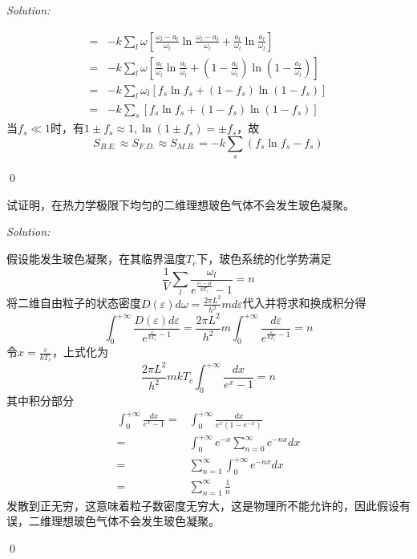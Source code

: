 \documentclass[12pt,a4paper]{article}
\newenvironment{problem}[2][Problem]{\begin{trivlist}
\item[\hskip \labelsep {\bfseries #1}\hskip \labelsep {\bfseries #2.}]}{\end{trivlist}}
\newenvironment{sol}
    {\emph{Solution:}
    }
    {
    \qed
    }
\begin{document}
\begin{sol}
\begin{align}
\nonumber=&-k\sum_l\omega[\frac{\omega_l-a_l}{\omega_l}\ln\frac{\omega_l-a_l}{\omega_l}+\frac{a_l}{\omega_l}\ln\frac{a_l}{\omega_l}]\\
\nonumber=&-k\sum_l\omega[\frac{a_l}{\omega_l}\ln\frac{a_l}{\omega_l}+(1-\frac{a_l}{\omega_l})\ln(1-\frac{a_l}{\omega_l})]\\
\nonumber=&-k\sum_l\omega_l[f_s\ln f_s+(1-f_s)\ln(1-f_s)]\\
=&-k\sum_s[f_s\ln f_s+(1-f_s)\ln(1-f_s)]
\end{align}
当$f_s\ll1$时，有$1\pm f_s\approx1,\ln(1\pm f_s)=\pm f_s$，故
\begin{equation}
S_{B.E.}\approx S_{F.D.}\approx S_{M.B.}=-k\sum_s(f_s\ln f_s-f_s)
\end{equation}
\end{sol}

\begin{problem}{8.4}
试证明，在热力学极限下均匀的二维理想玻色气体不会发生玻色凝聚。
\end{problem}
\begin{sol}
假设能发生玻色凝聚，在其临界温度$T_c$下，玻色系统的化学势满足
\begin{equation}
\frac{1}{V}\sum_l\frac{\omega_l}{e^{\frac{\varepsilon_l-\mu}{kT_c}}-1}=n
\end{equation}
将二维自由粒子的状态密度$D(\varepsilon)d\omega=\frac{2\pi L^2}{h^2}md\varepsilon$代入并将求和换成积分得
\begin{equation}
\int_0^{+\infty}\frac{D(\varepsilon)d\varepsilon}{e^{\frac{\varepsilon}{kT_c}-1}}=\frac{2\pi L^2}{h^2}m\int_0^{+\infty}\frac{d\varepsilon}{e^{\frac{\varepsilon}{kT_c}-1}}=n
\end{equation}
令$x=\frac{\varepsilon}{kT_c}$，上式化为
\begin{equation}
\frac{2\pi L^2}{h^2}mkT_c\int_0^{+\infty}\frac{dx}{e^x-1}=n
\end{equation}
其中积分部分
\begin{align}
\nonumber\int_0^{+\infty}\frac{dx}{e^x-1}=&\int_0^{+\infty}\frac{dx}{e^x(1-e^{-x})}\\
\nonumber=&\int_0^{+\infty}e^{-x}\sum_{n=0}^{\infty}e^{-nx}dx\\
\nonumber=&\sum_{n=1}^{\infty}\int_0^{+\infty}e^{-nx}dx\\
\nonumber=&\sum_{n=1}^{\infty}\frac{1}{n}
\end{align}
发散到正无穷，这意味着粒子数密度无穷大，这是物理所不能允许的，因此假设有误，二维理想玻色气体不会发生玻色凝聚。
\end{sol}
\end{document}

